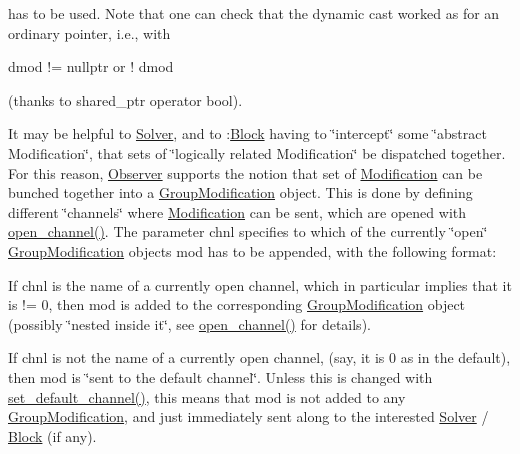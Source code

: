 has to be used. Note that one can check that the dynamic cast worked as for an ordinary pointer, i.\+e., with \begin{DoxyVerb}dmod != nullptr       or        ! dmod
\end{DoxyVerb}


(thanks to shared\+\_\+ptr operator bool).

It may be helpful to \mbox{\hyperlink{class_s_m_spp__di__unipi__it_1_1_solver}{Solver}}, and to \+:\mbox{\hyperlink{class_s_m_spp__di__unipi__it_1_1_block}{Block}} having to \char`\"{}intercept\char`\"{} some \char`\"{}abstract Modification\char`\"{}, that sets of \char`\"{}logically related Modification\char`\"{} be dispatched together. For this reason, \mbox{\hyperlink{class_s_m_spp__di__unipi__it_1_1_observer}{Observer}} supports the notion that set of \mbox{\hyperlink{class_s_m_spp__di__unipi__it_1_1_modification}{Modification}} can be bunched together into a \mbox{\hyperlink{class_s_m_spp__di__unipi__it_1_1_group_modification}{Group\+Modification}} object. This is done by defining different \char`\"{}channels\char`\"{} where \mbox{\hyperlink{class_s_m_spp__di__unipi__it_1_1_modification}{Modification}} can be sent, which are opened with \mbox{\hyperlink{class_s_m_spp__di__unipi__it_1_1_block_a6459343d63aec3d39ece1e20467db47b}{open\+\_\+channel()}}. The parameter chnl specifies to which of the currently \char`\"{}open\char`\"{} \mbox{\hyperlink{class_s_m_spp__di__unipi__it_1_1_group_modification}{Group\+Modification}} objects mod has to be appended, with the following format\+:


\begin{DoxyItemize}
\item If chnl is the name of a currently open channel, which in particular implies that it is != 0, then mod is added to the corresponding \mbox{\hyperlink{class_s_m_spp__di__unipi__it_1_1_group_modification}{Group\+Modification}} object (possibly \char`\"{}nested inside it\char`\"{}, see \mbox{\hyperlink{class_s_m_spp__di__unipi__it_1_1_block_a6459343d63aec3d39ece1e20467db47b}{open\+\_\+channel()}} for details).
\item If chnl is not the name of a currently open channel, (say, it is 0 as in the default), then mod is \char`\"{}sent to the default channel\char`\"{}. Unless this is changed with \mbox{\hyperlink{class_s_m_spp__di__unipi__it_1_1_block_ae1e61f1d3f7185b6824f02488901a0ad}{set\+\_\+default\+\_\+channel()}}, this means that mod is not added to any \mbox{\hyperlink{class_s_m_spp__di__unipi__it_1_1_group_modification}{Group\+Modification}}, and just immediately sent along to the interested \mbox{\hyperlink{class_s_m_spp__di__unipi__it_1_1_solver}{Solver}} / \mbox{\hyperlink{class_s_m_spp__di__unipi__it_1_1_block}{Block}} (if any). 
\end{DoxyItemize}

